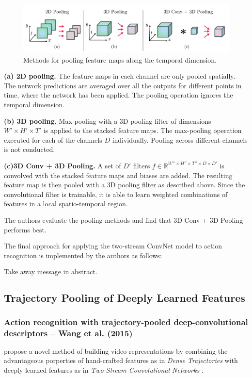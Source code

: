 \begin{figure}[H]
    \centering
    \includegraphics[width=\textwidth]{img_deep/streamfusion_temppooling}
\caption{Methods for pooling feature maps along the temporal dimension. \cite{feichtenhofer_convolutional_2016}}
    \label{fig:streamfusion_temppooling}
\end{figure}

\textbf{(a) 2D pooling.}
The feature maps in each channel are only pooled spatially.
The network predictions are averaged over all the outputs for different points in time, where the network has been applied.
The pooling operation ignores the temporal dimension.

\textbf{(b) 3D pooling.}
Max-pooling with a 3D pooling filter of dimensions $W' \times H' \times T'$ is applied to the stacked feature maps.
The max-pooling operation executed for each of the channels $D$ individually.
Pooling across different channels is not conducted.

\textbf{(c)3D Conv + 3D Pooling.}
A set of $D'$ filters $f \in \mathbb{R}^{W'' \times H'' \times T'' \times D \times D'}$ is convolved with the stacked feature maps and biases are added.
The resulting feature map is then pooled with a 3D pooling filter as described above.
Since the convolutional filter is trainable, it is able to learn weighted combinations of features in a local spatio-temporal region.

The authors evaluate the pooling methods and find that 3D Conv + 3D Pooling performs best.

The final approach for applying the two-stream ConvNet model to action recognition is implemented by the authors as follows:


Take away message in abstract.

\subsection{Trajectory Pooling of Deeply Learned Features}

\subsubsection{Action recognition with trajectory-pooled deep-convolutional descriptors -- Wang et al. (2015)}
\textcite{wang_action_2015} propose a novel method of building video representations by combining the advantageous porperties of hand-crafted features as in \textit{Dense Trajectories} \cite{wang_action_2013} with deeply learned features as in \textit{Two-Stream Convolutional Networks} \cite{simonyan_two-stream_2014}.


